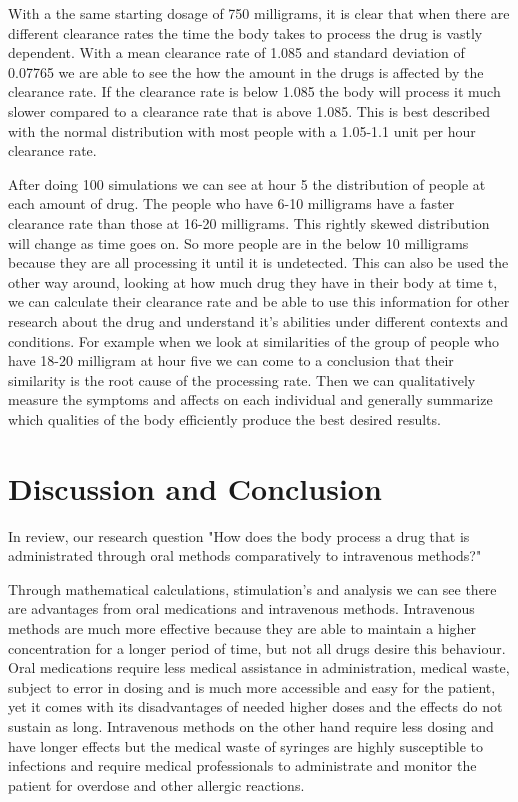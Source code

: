 \documentclass{article}
\begin{document}
With a the same starting dosage of 750 milligrams, it is clear that when there are different clearance rates the time the body takes to process the drug is vastly dependent. With a mean clearance rate of 1.085 and standard deviation of 0.07765 we are able to see the how the amount in the drugs is affected by the clearance rate. If the clearance rate is below 1.085 the body will process it much slower compared to a clearance rate that is above 1.085. This is best described with the normal distribution with most people with a 1.05-1.1 unit per hour clearance rate. 

After doing 100 simulations we can see at hour 5 the distribution of people at each amount of drug. The people who have 6-10 milligrams have a faster clearance rate than those at 16-20 milligrams. This rightly skewed distribution will change as time goes on. So more people are in the below 10 milligrams because they are all processing it until it is undetected. This can also be used the other way around, looking at how much drug they have in their body at time t, we can calculate their clearance rate and be able to use this information for other research about the drug and understand it's abilities under different contexts and conditions. For example when we look at similarities of the group of people who have 18-20 milligram at hour five we can come to a conclusion that their similarity is the root cause of the processing rate. Then we can qualitatively measure the symptoms and affects on each individual and generally summarize which qualities of the body efficiently produce the best desired results. 


\section*{Discussion and Conclusion}

In review, our research question "How does the body process a drug that is administrated through oral methods comparatively to intravenous methods?"

Through mathematical calculations, stimulation's and analysis we can see there are advantages from oral medications and intravenous methods. Intravenous methods are much more effective because they are able to maintain a higher concentration for a longer period of time, but not all drugs desire this behaviour. Oral medications require less medical assistance in administration, medical waste, subject to error in dosing and is much more accessible and easy for the patient, yet it comes with its disadvantages of needed higher doses and the effects do not sustain as long. Intravenous methods on the other hand require less dosing and have longer effects but the medical waste of syringes are highly susceptible to infections and require medical professionals to administrate and monitor the patient for overdose and other allergic reactions. 
\end{document}
